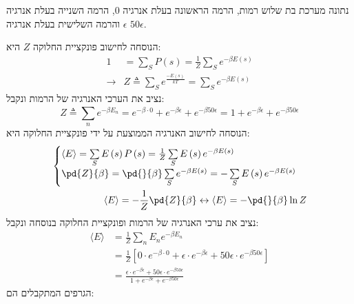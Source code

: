 \documentclass{article}
\begin{document}
\begin{Question}%
נתונה מערכת בת שלוש רמות, הרמה הראשונה בעלת אנרגיה 0, הרמה השנייה בעלת אנרגיה $\epsilon$ והרמה השלישית בעלת אנרגיה $50\epsilon$.
\end{Question}
\begin{Answer}
הנוסחה לחישוב פונקציית החלוקה $Z$ היא:
\begin{align}\label{פונקציית החלוקה}
    1&=\sum \limits^{}_{S}{P\left( s \right)}=\frac{1}{Z}\sum \limits^{}_{S}{e^{-\beta E\left( s \right)}}\\
    \rightarrow&Z\triangleq \sum \limits^{}_{S}{e^{\frac{-E\left( s \right)}{kT} }}=\sum \limits^{}_{S}{e^{-\beta E\left( s \right)}}
\end{align}
נציב את הערכי האנרגיה של הרמות ונקבל:
\begin{equation*}
    Z\triangleq \sum \limits^{}_{n}{e^{-\beta E_{n}}}=e^{-\beta\cdot0}+e^{-\beta\epsilon}+e^{-\beta 50\epsilon}=1+e^{-\beta\epsilon}+e^{-\beta 50\epsilon}
\end{equation*}
הנוסחה לחישוב האנרגיה הממוצעת על ידי פונקציית החלוקה היא:
\begin{align}\label{אנרגיה ממוצעת}
    \begin{cases}
        \langle E \rangle=\sum \limits^{}_{S}{E\left( s \right)P\left( s \right)}=\frac{1}{Z}\sum \limits^{}_{S}{E\left( s \right)e^{-\beta E\left( s \right)}}\\
        \pd{Z}{\beta}=\pd{}{\beta}\sum \limits^{}_{S}{e^{-\beta E\left( s \right)}}=-\sum \limits^{}_{S}{E\left( s \right)e^{-\beta E\left( s \right)}}
    \end{cases}\\
    \langle E \rangle=-\frac{1}{Z}\pd{Z}{\beta}\leftrightarrow\langle E \rangle=-\pd{}{\beta}\ln{Z}
\end{align}
נציב את ערכי האנרגיה של הרמות ופונקציית החלוקה בנוסחה ונקבל:
\begin{align*}
    \langle E \rangle&=\frac{1}{Z}\sum \limits^{}_{n}{E_{n}e^{-\beta E_{n}}}\\
    &=\frac{1}{Z}\left[ 0\cdot e^{-\beta\cdot0} +\epsilon\cdot e^{-\beta\epsilon}+50\epsilon\cdot e^{-\beta 50\epsilon}\right]\\
    &=\frac{\epsilon\cdot e^{-\beta\epsilon}+50\epsilon\cdot e^{-\beta 50\epsilon}}{1+e^{-\beta\epsilon}+e^{-\beta 50\epsilon}}
\end{align*}
הגרפים המתקבלים הם:\\

\end{Answer}
\end{document}
